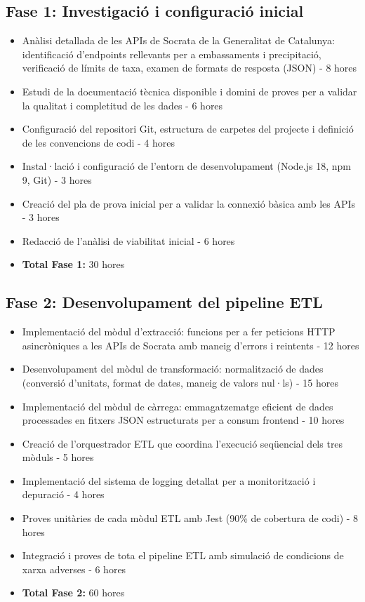 \subsection{Fase 1: Investigació i configuració inicial}
\begin{itemize}
    \item Anàlisi detallada de les APIs de Socrata de la Generalitat de Catalunya: identificació d'endpoints rellevants per a embassaments i precipitació, verificació de límits de taxa, examen de formats de resposta (JSON) - 8 hores
    \item Estudi de la documentació tècnica disponible i domini de proves per a validar la qualitat i completitud de les dades - 6 hores
    \item Configuració del repositori Git, estructura de carpetes del projecte i definició de les convencions de codi - 4 hores
    \item Instal·lació i configuració de l'entorn de desenvolupament (Node.js 18, npm 9, Git) - 3 hores
    \item Creació del pla de prova inicial per a validar la connexió bàsica amb les APIs - 3 hores
    \item Redacció de l'anàlisi de viabilitat inicial - 6 hores
    \item \textbf{Total Fase 1:} 30 hores
\end{itemize}

\subsection{Fase 2: Desenvolupament del pipeline ETL}
\begin{itemize}
    \item Implementació del mòdul d'extracció: funcions per a fer peticions HTTP asincròniques a les APIs de Socrata amb maneig d'errors i reintents - 12 hores
    \item Desenvolupament del mòdul de transformació: normalització de dades (conversió d'unitats, format de dates, maneig de valors nul·ls) - 15 hores
    \item Implementació del mòdul de càrrega: emmagatzematge eficient de dades processades en fitxers JSON estructurats per a consum frontend - 10 hores
    \item Creació de l'orquestrador ETL que coordina l'execució seqüencial dels tres mòduls - 5 hores
    \item Implementació del sistema de logging detallat per a monitorització i depuració - 4 hores
    \item Proves unitàries de cada mòdul ETL amb Jest (90\% de cobertura de codi) - 8 hores
    \item Integració i proves de tota el pipeline ETL amb simulació de condicions de xarxa adverses - 6 hores
    \item \textbf{Total Fase 2:} 60 hores
\end{itemize}

